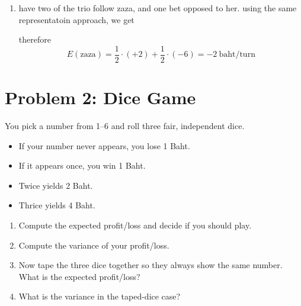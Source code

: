 \begin{enumerate}
        in this case (plan 1), the winner set never is empty, so there's no money lost from the table (as someone always win), so
\[
E(\text{sam}+\text{may}+\text{aj}) = E((\text{sam}+\text{may}+\text{aj}+\text{zaza}) - \text{zaza}) = 0 - E(\text{zaza}) = \boxed{+1\ \text{baht/turn}}.
\]

    \medskip
    \begin{center}
    \rule{0.3\linewidth}{0.2pt}
    \end{center}
    \medskip

\item have two of the trio follow zaza, and one bet opposed to her. using the same representatoin approach, we get

  \begin{center}
  \end{center}

  therefore
  \[
  E(\text{zaza}) = \frac12\cdot(+2)+\frac12\cdot(-6)=
  \boxed{-2\ \text{baht/turn}}
  \]
  \end{enumerate}

\vspace{1em}
\hrulefill

\section*{Problem 2: Dice Game}
You pick a number from 1--6 and roll three fair, independent dice.
\begin{itemize}
    \item If your number never appears, you lose 1 Baht.
    \item If it appears once, you win 1 Baht.
    \item Twice yields 2 Baht.
    \item Thrice yields 4 Baht.
\end{itemize}
\begin{enumerate}[label=\arabic*.]
    \item Compute the expected profit/loss and decide if you should play.
    \item Compute the variance of your profit/loss.
    \item Now tape the three dice together so they always show the same number. What is the expected profit/loss?
    \item What is the variance in the taped-dice case?
\end{enumerate}

